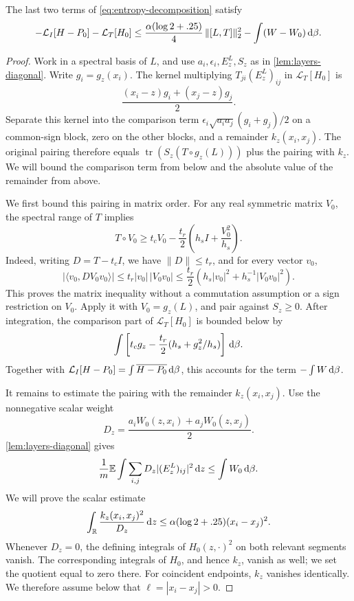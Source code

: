 \begin{lemma}\label{lem:layers-variable}
The last two terms of \eqref{eq:entropy-decomposition} satisfy
\begin{equation}
 -\mathcal{L}_I[H-P_0]-\mathcal{L}_T[H_0]
 \le\frac{\alpha(\log2+.25)}4\,\|[L,T]\|_2^2
       -\int(W-W_0)\,\mathrm{d} \beta.
 \label{eq:layer-commutator-bound}
\end{equation}
\end{lemma}

\begin{proof}
Work in a spectral basis of $L$, and use $a_i,\epsilon_i,E_z^L,S_z$ as in \cref{lem:layers-diagonal}. Write $g_i=g_z(x_i)$. The kernel multiplying $T_{ji}(E_z^L)_{ij}$ in $\mathcal{L}_T[H_0]$ is
\[
 \frac{(x_i-z)g_i+(x_j-z)g_j}{2}.
\]
Separate this kernel into the comparison term $\epsilon_i\sqrt{a_i a_j}(g_i+g_j)/2$ on a common-sign block, zero on the other blocks, and a remainder $k_z(x_i,x_j)$. The original pairing therefore equals $\operatorname{tr}(S_z(T\circ g_z(L)))$ plus the pairing with $k_z$. We will bound the comparison term from below and the absolute value of the remainder from above.

We first bound this pairing in matrix order. For any real symmetric matrix $V_0$, the spectral range of $T$ implies
\[
 T\circ V_0\ge
 t_cV_0-\frac{t_r}{2}\left(h_sI+\frac{V_0^2}{h_s}\right).
\]
Indeed, writing $D=T-t_cI$, we have $\|D\|\le t_r$, and for every vector $v_0$,
\[
 |\langle v_0,DV_0v_0\rangle|
 \le t_r|v_0|\,|V_0v_0|
 \le\frac{t_r}{2}
       \left(h_s|v_0|^2+h_s^{-1}|V_0v_0|^2\right).
\]
This proves the matrix inequality without a commutation assumption or a sign restriction on $V_0$. Apply it with $V_0=g_z(L)$, and pair against $S_z\ge0$. After integration, the comparison part of $\mathcal{L}_T[H_0]$ is bounded below by
\[
 \int\left[t_cg_z-\frac{t_r}{2}
                    (h_s+g_z^2/h_s)\right]\,\mathrm{d} \beta.
\]
Together with $\mathcal{L}_I[H-P_0]=\int\overline{H-P_0}\,\mathrm{d} \beta$, this accounts for the term $-\int W\,\mathrm{d} \beta$.

It remains to estimate the pairing with the remainder $k_z(x_i,x_j)$. Use the nonnegative scalar weight
\[
 D_z=\frac{a_iW_0(z,x_i)+a_jW_0(z,x_j)}2.
\]
\cref{lem:layers-diagonal} gives
\[
 \frac1m\mathbb{E}\int\sum_{i,j}
          D_z|(E_z^L)_{ij}|^2\,\mathrm{d} z
 \le\int W_0\,\mathrm{d} \beta.
\]
We will prove the scalar estimate
\[
 \int_{\mathbb{R}}\frac{k_z(x_i,x_j)^2}{D_z}\,\mathrm{d} z
 \le\alpha(\log2+.25)(x_i-x_j)^2.
\]
Whenever $D_z=0$, the defining integrals of $H_0(z,\cdot)^2$ on both relevant segments vanish.  The corresponding integrals of $H_0$, and hence $k_z$, vanish as well; we set the quotient equal to zero there. For coincident endpoints, $k_z$ vanishes identically. We therefore assume below that $\ell=|x_i-x_j|>0$.


\end{proof}
